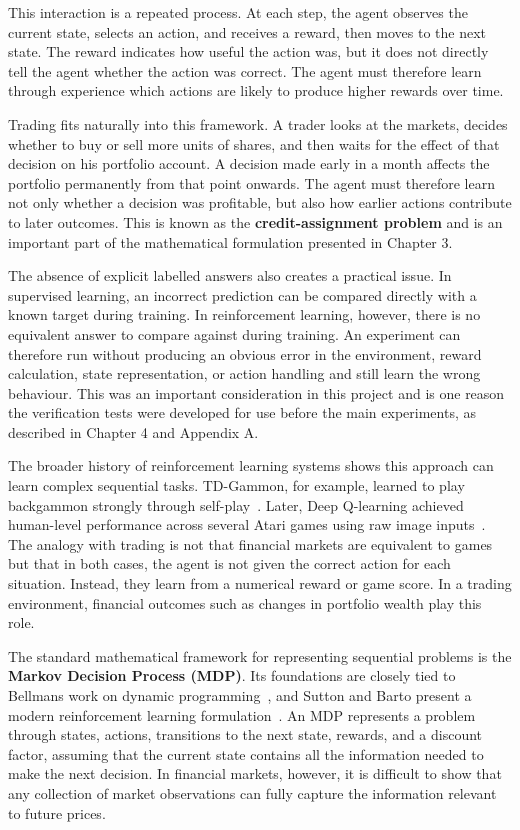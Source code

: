 This interaction is a repeated process. At each step, the agent observes
the current state, selects an action, and receives a reward, then moves
to the next state. The reward indicates how useful the action was, but
it does not directly tell the agent whether the action was correct. The
agent must therefore learn through experience which actions are likely
to produce higher rewards over time.

Trading fits naturally into this framework. A trader looks at the
markets, decides whether to buy or sell more units of shares, and then
waits for the effect of that decision on his portfolio account. A
decision made early in a month affects the portfolio permanently from
that point onwards. The agent must therefore learn not only whether a
decision was profitable, but also how earlier actions contribute to
later outcomes. This is known as the \textbf{credit-assignment problem}
and is an important part of the mathematical formulation presented in
Chapter 3.

The absence of explicit labelled answers also creates a practical issue.
In supervised learning, an incorrect prediction can be compared directly
with a known target during training. In reinforcement learning, however,
there is no equivalent answer to compare against during training. An
experiment can therefore run without producing an obvious error in the
environment, reward calculation, state representation, or action
handling and still learn the wrong behaviour. This was an important
consideration in this project and is one reason the verification tests
were developed for use before the main experiments, as described in
Chapter 4 and Appendix A.

The broader history of reinforcement learning systems shows this
approach can learn complex sequential tasks. TD-Gammon, for example,
learned to play backgammon strongly through self-play~\cite{tesauro1995}. Later,
Deep Q-learning achieved human-level performance across several Atari
games using raw image inputs~\cite{mnih2015}. The analogy with trading is not
that financial markets are equivalent to games but that in both cases,
the agent is not given the correct action for each situation. Instead,
they learn from a numerical reward or game score. In a trading
environment, financial outcomes such as changes in portfolio wealth play
this role.

The standard mathematical framework for representing sequential problems
is the \textbf{Markov Decision Process (MDP)}. Its foundations are
closely tied to Bellman\textquotesingle s work on dynamic programming~\cite{bellman1957}, and Sutton and Barto present a modern reinforcement learning
formulation~\cite{sutton2018}. An MDP represents a problem through states,
actions, transitions to the next state, rewards, and a discount factor,
assuming that the current state contains all the information needed to
make the next decision. In financial markets, however, it is difficult
to show that any collection of market observations can fully capture the
information relevant to future prices.

